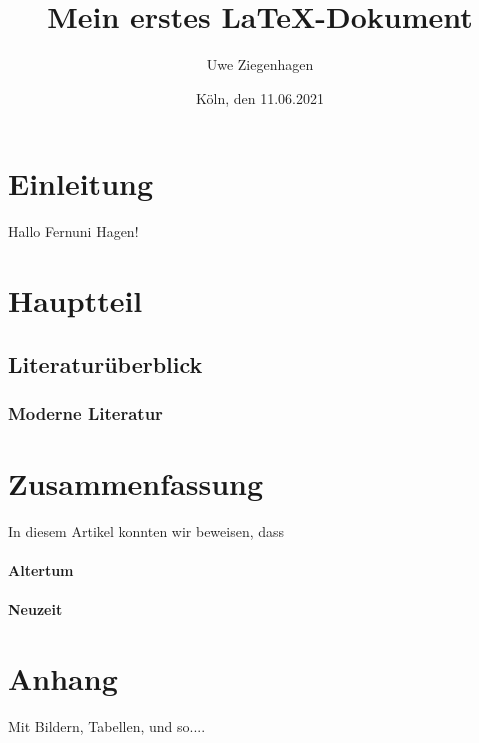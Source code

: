 \documentclass[ngerman,12pt]{scrartcl}
\title{Mein erstes \LaTeX-Dokument}
\author{Uwe Ziegenhagen}
\date{Köln, den 11.06.2021}
\begin{document}
\maketitle

\tableofcontents

\section{Einleitung}

Hallo Fernuni Hagen! 

\section{Hauptteil}
\subsection{Literaturüberblick}
\subsubsection{Moderne Literatur}

\blindtext[100]

\section{Zusammenfassung}

In diesem Artikel konnten wir beweisen, dass

\paragraph{Altertum} \blindtext

\paragraph{Neuzeit} \blindtext


\section{Anhang}

Mit Bildern, Tabellen, und so....
\end{document}

